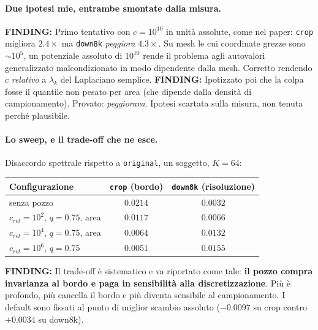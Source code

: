 \documentclass[11pt,a4paper]{article}
\newcommand{\finding}[1]{\textcolor{finding}{\textbf{FINDING:}} #1}
\begin{document}
\paragraph{Due ipotesi mie, entrambe smontate dalla misura.}
\finding{Primo tentativo con $c=10^{10}$ in unit\`a assolute, come nel paper: \texttt{crop}
migliora $2.4\times$ ma \texttt{down8k} \emph{peggiora} $4.3\times$. Su mesh le cui coordinate
grezze sono $\sim 10^5$, un potenziale assoluto di $10^{10}$ rende il problema agli autovalori
generalizzato malcondizionato in modo dipendente dalla mesh. Corretto rendendo $c$
\emph{relativo} a $\lambda_k$ del Laplaciano semplice.}
\finding{Ipotizzato poi che la colpa fosse il quantile non pesato per area (che dipende dalla
densit\`a di campionamento). Provato: \emph{peggiorava}. Ipotesi scartata sulla misura, non
tenuta perch\'e plausibile.}

\paragraph{Lo sweep, e il trade-off che ne esce.}
Disaccordo spettrale rispetto a \texttt{original}, un soggetto, $K=64$:

\begin{center}
\begin{tabular}{lcc}
\toprule
Configurazione & \texttt{crop} (bordo) & \texttt{down8k} (risoluzione) \\
\midrule
senza pozzo                    & $0.0214$ & $0.0032$ \\
$c_{rel}=10^2$, $q=0.75$, area & $\mathbf{0.0117}$ & $0.0066$ \\
$c_{rel}=10^4$, $q=0.75$, area & $0.0064$ & $0.0132$ \\
$c_{rel}=10^6$, $q=0.75$       & $0.0051$ & $0.0155$ \\
\bottomrule
\end{tabular}
\end{center}

\finding{Il trade-off \`e sistematico e va riportato come tale: \textbf{il pozzo compra
invarianza al bordo e paga in sensibilit\`a alla discretizzazione}. Pi\`u \`e profondo, pi\`u
cancella il bordo e pi\`u diventa sensibile al campionamento. I default sono fissati al punto
di miglior scambio assoluto ($-0.0097$ su crop contro $+0.0034$ su down8k).}
\end{document}
